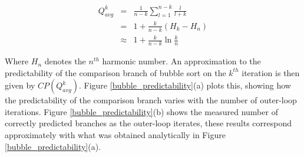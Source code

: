 \documentclass[acmtocl]{acmtrans2m}
\begin{document}
\begin{eqnarray*}
Q^k_{avg} &=& \frac{1}{n - k} \sum_{l = 1}^{n - k} \frac{l}{l + k} \\
          &=& 1 + \frac{k}{n - k}(H_k - H_n)\\
         &\approx& 1 + \frac{k}{n - k}\ln\frac{k}{n}
\end{eqnarray*}

\noindent
Where $H_n$ denotes the $n^{th}$ harmonic number. An approximation to the
predictability of the comparison branch of bubble sort on the $k^{th}$ iteration
is then given by $CP(Q^k_{avg})$.  Figure \ref{bubble_predictability}(a) plots
this, showing how the predictability of the comparison branch varies with the
number of outer-loop iterations. Figure \ref{bubble_predictability}(b) shows the
measured number of correctly predicted branches as the outer-loop iterates,
these results correspond approximately with what was obtained analytically in
Figure \ref{bubble_predictability}(a).
\end{document}
